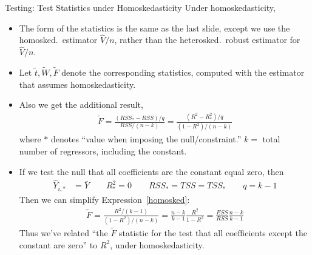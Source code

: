 \documentclass[aspectratio=169, handout]{beamer}
\newcommand{\sumin}{\sum^n_{i=1}}
\begin{document}
{\scriptsize
\begin{frame}{Testing: Test Statistics under Homoskedasticity}
Under homoskedasticity,
\vspace{-5pt}
\begin{itemize}

  \item
    The form of the statistics is the same as the last slide, except we
    use the homosked.\ estimator $\hat{V}/n$, rather than the
    heterosked.\ robust estimator for $\hat{V}/n$.

  \item
    Let $\widetilde{t}, \widetilde{W}, \widetilde{F}$ denote the
    corresponding statistics, computed with the estimator that assumes
    homoskedasticity.

  \item
    Also we get the \alert{additional result},
    \begin{align}
      \widetilde{F}
      = \frac{(RSS_*-RSS)/q}{RSS/(n-k)}
      = \frac{(R^2-R^2_*)/q}{(1-R^2)/(n-k)}
      \label{homosked}
    \end{align}
    where $*$ denotes ``value when imposing the null/constraint.''
    $k=$ total number of regressors, including the constant.

  \item
    If we test the null that \alert{all} coefficients are the constant
    equal zero, then
    \begin{align*}
      \hat{Y}_{i,*} &= \bar{Y}
      \qquad
      R^2_* = 0
      \qquad
      RSS_* = TSS=TSS_*
      \qquad
      q = k-1
    \end{align*}
    Then we can simplify Expression~\ref{homosked}:
    \begin{align*}
      \tilde{F}
      = \frac{R^2/(k-1)}{(1-R^2)/(n-k)}
      =
      \frac{n-k}{k-1}
      \frac{R^2}{1-R^2}
      =
      \frac{ESS}{RSS}
      \frac{n-k}{k-1}
    \end{align*}
    Thus we've related ``the $\tilde{F}$ statistic for the test that all
    coefficients except the constant are zero'' to $R^2$, under
    homoskedasticity.
\end{itemize}
\end{frame}
}
\end{document}
